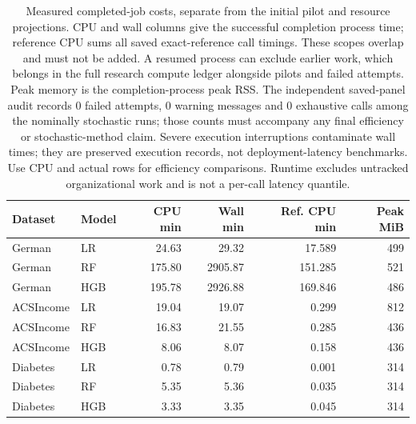 \begin{table}[tb]
\centering
\caption{Measured completed-job costs, separate from the initial pilot and resource projections. CPU and wall columns give the successful completion process time; reference CPU sums all saved exact-reference call timings. These scopes overlap and must not be added. A resumed process can exclude earlier work, which belongs in the full research compute ledger alongside pilots and failed attempts. Peak memory is the completion-process peak RSS. The independent saved-panel audit records 0 failed attempts, 0 warning messages and 0 exhaustive calls among the nominally stochastic runs; those counts must accompany any final efficiency or stochastic-method claim. Severe execution interruptions contaminate wall times; they are preserved execution records, not deployment-latency benchmarks. Use CPU and actual rows for efficiency comparisons. Runtime excludes untracked organizational work and is not a per-call latency quantile.}
\label{tab:main-compute}
\small
\begin{tabular}{llrrrr}
\toprule
Dataset & Model & CPU min & Wall min & Ref. CPU min & Peak MiB \\
\midrule
German & LR & 24.63 & 29.32 & 17.589 & 499 \\
German & RF & 175.80 & 2905.87 & 151.285 & 521 \\
German & HGB & 195.78 & 2926.88 & 169.846 & 486 \\
ACSIncome & LR & 19.04 & 19.07 & 0.299 & 812 \\
ACSIncome & RF & 16.83 & 21.55 & 0.285 & 436 \\
ACSIncome & HGB & 8.06 & 8.07 & 0.158 & 436 \\
Diabetes & LR & 0.78 & 0.79 & 0.001 & 314 \\
Diabetes & RF & 5.35 & 5.36 & 0.035 & 314 \\
Diabetes & HGB & 3.33 & 3.35 & 0.045 & 314 \\
\bottomrule
\end{tabular}
\end{table}

